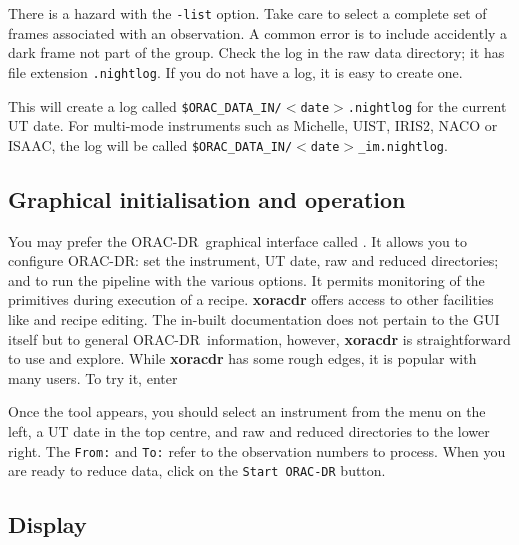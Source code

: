 \documentclass[twoside,11pt,nolof]{starlink}
\providecommand{\ORACDR}{{\footnotesize ORAC-DR}}
\begin{document}
There is a hazard with the \texttt{-list} option.  Take care to select a
complete set of frames associated with an observation.  A common error
is to include accidently a dark frame not part of the group.  Check
the log in the raw data directory; it has file extension \texttt{.nightlog}.  If you do not have a log, it is easy to create one.
\label{night_log}

\begin{terminalv}
\end{terminalv}
This will create a log called \texttt{\$ORAC\_DATA\_IN/$<$date$>$.nightlog}
for the current UT date. For multi-mode instruments such as Michelle, UIST,
IRIS2, NACO or ISAAC, the log will be called
\goodbreak \texttt{\$ORAC\_DATA\_IN/$<$date$>$\_im.nightlog}.

\subsection{Graphical initialisation and
operation\label{graphical_initialisation_and_operation}}

You may prefer the \ORACDR\ graphical interface called
.
  It allows you to configure
ORAC-DR: set the instrument, UT date, raw and reduced directories; and
to run the pipeline with the various options.  It permits monitoring
of the primitives during execution of a recipe. \textbf{xoracdr} offers
access to other facilities like
 and recipe editing.  The in-built
documentation does not pertain to the GUI itself but to general
\ORACDR\ information, however, \textbf{xoracdr} is straightforward to use
and explore.  While \textbf{xoracdr} has some rough edges, it is popular
with many users.  To try it, enter

\begin{terminalv}
\end{terminalv}

Once the tool appears, you should select an instrument from the menu on
the left, a UT date in the top centre, and raw and reduced directories
to the lower right.   The \texttt{From:} and \texttt{To:} refer to the
observation numbers to process.  When you are ready to reduce data,
click on the \texttt{Start ORAC-DR} button.

\subsection{Display\label{display}}
\end{document}
